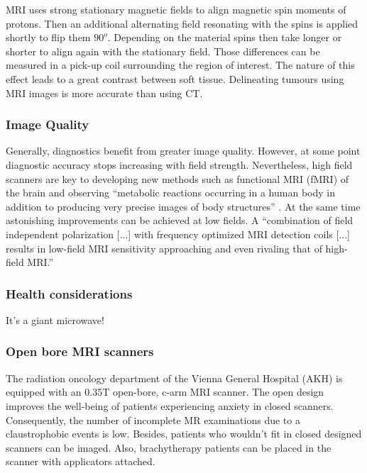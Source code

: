 MRI uses strong stationary magnetic fields to align magnetic spin moments of protons.
Then an additional alternating field resonating with the spins is applied shortly to flip them $90^o$.
Depending on the material spins then take longer or shorter to align again with the stationary field.
Those differences can be measured in a pick-up coil surrounding the region of interest.
The nature of this effect leads to a great contrast between soft tissue. \cite{Currie2013}
Delineating tumours using MRI images is more accurate than using CT. \cite{Rasch1999, Debois1999a, Roach1996}


\subsubsection{Image Quality}
Generally, diagnostics benefit from greater image quality.
However, at some point diagnostic accuracy stops increasing with field strength.
Nevertheless, high field scanners are key to developing new methods such as functional MRI (fMRI) of the brain \cite{Duyn2012} and observing ``metabolic reactions occurring in a human body in addition to producing very precise images of body structures'' \cite{Wada2010}.
At the same time astonishing improvements can be achieved at low fields.
A ``combination of field independent polarization [...] with frequency optimized MRI detection coils [...] results in low-field MRI sensitivity approaching and even rivaling that of high-field MRI.'' \cite{Coffey2013}

\subsubsection{Health considerations}

It's a giant microwave!

\subsubsection{Open bore MRI scanners}

The radiation oncology department of the Vienna General Hospital (AKH) is equipped with an 0.35T open-bore, c-arm MRI scanner.
The open design improves the well-being of patients experiencing anxiety in closed scanners.
Consequently, the number of incomplete MR examinations due to a claustrophobic events is low. \cite{Enders2011a, Bangard2007}
Besides, patients who wouldn't fit in closed designed scanners can be imaged.
Also, brachytherapy patients can be placed in the scanner with applicators attached.

